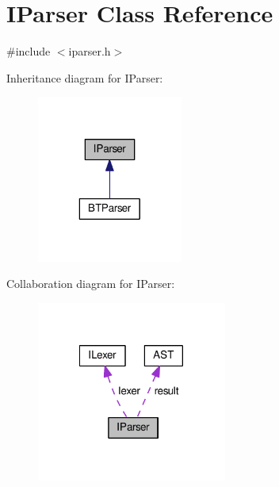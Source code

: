 \hypertarget{class_i_parser}{\section{I\-Parser Class Reference}
\label{class_i_parser}
}


{\ttfamily \#include $<$iparser.\-h$>$}



Inheritance diagram for I\-Parser\-:
\nopagebreak
\begin{figure}[H]
\begin{center}
\leavevmode
\includegraphics[width=136pt]{class_i_parser__inherit__graph}
\end{center}
\end{figure}


Collaboration diagram for I\-Parser\-:
\nopagebreak
\begin{figure}[H]
\begin{center}
\leavevmode
\includegraphics[width=177pt]{class_i_parser__coll__graph}
\end{center}
\end{figure}
